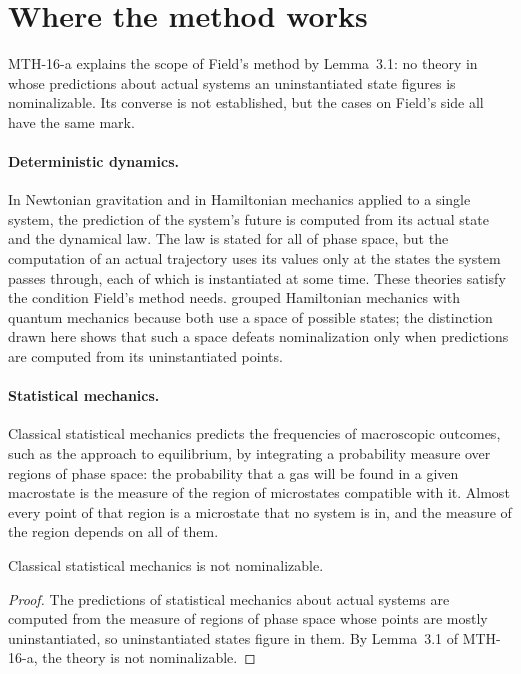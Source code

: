 \documentclass{situationist-preprint}
\begin{document}
\section{Where the method works}

MTH-16-a explains the scope of Field's method by Lemma~3.1: no theory in whose predictions about actual systems an uninstantiated state figures is nominalizable. Its converse is not established, but the cases on Field's side all have the same mark.

\paragraph{Deterministic dynamics.} In Newtonian gravitation and in Hamiltonian mechanics applied to a single system, the prediction of the system's future is computed from its actual state and the dynamical law. The law is stated for all of phase space, but the computation of an actual trajectory uses its values only at the states the system passes through, each of which is instantiated at some time. These theories satisfy the condition Field's method needs. \citet{Malament1982} grouped Hamiltonian mechanics with quantum mechanics because both use a space of possible states; the distinction drawn here shows that such a space defeats nominalization only when predictions are computed from its uninstantiated points.

\paragraph{Statistical mechanics.} Classical statistical mechanics predicts the frequencies of macroscopic outcomes, such as the approach to equilibrium, by integrating a probability measure over regions of phase space: the probability that a gas will be found in a given macrostate is the measure of the region of microstates compatible with it. Almost every point of that region is a microstate that no system is in, and the measure of the region depends on all of them.

\begin{proposition}\label{p:sm}
Classical statistical mechanics is not nominalizable.
\end{proposition}

\begin{proof}
The predictions of statistical mechanics about actual systems are computed from the measure of regions of phase space whose points are mostly uninstantiated, so uninstantiated states figure in them. By Lemma~3.1 of MTH-16-a, the theory is not nominalizable.
\end{proof}
\end{document}
